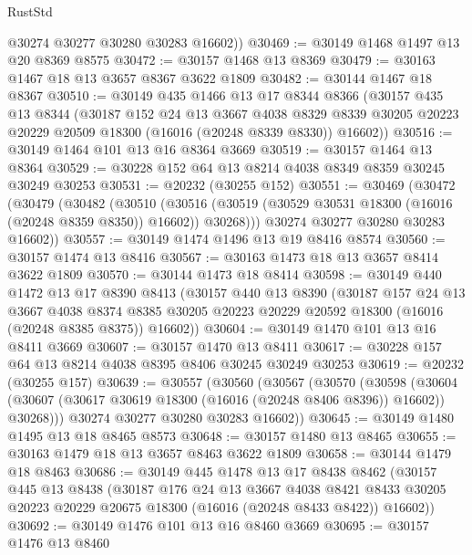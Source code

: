 \begin{lexlean}{RustStd}
\begin{coremodule}
        @30274
        @30277
        @30280
        @30283
        @16602))
@30469 := @30149 @1468 @1497 @13 @20 @8369 @8575
@30472 := @30157 @1468 @13 @8369
@30479 := @30163 @1467 @18 @13 @3657 @8367 @3622 @1809
@30482 := @30144 @1467 @18 @8367
@30510 := @30149
    @435
    @1466
    @13
    @17
    @8344
    @8366
    (@30157
      @435
      @13
      @8344
      (@30187
        @152
        @24
        @13
        @3667
        @4038
        @8329
        @8339
        @30205
        @20223
        @20229
        @20509
        @18300
        (@16016 (@20248 @8339 @8330))
        @16602))
@30516 := @30149 @1464 @101 @13 @16 @8364 @3669
@30519 := @30157 @1464 @13 @8364
@30529 := @30228 @152 @64 @13 @8214 @4038 @8349 @8359 @30245 @30249 @30253
@30531 := @20232 (@30255 @152)
@30551 := @30469
    (@30472
      (@30479
        (@30482
          (@30510
            (@30516 (@30519 (@30529 @30531 @18300 (@16016 (@20248 @8359 @8350)) @16602)) @30268)))
        @30274
        @30277
        @30280
        @30283
        @16602))
@30557 := @30149 @1474 @1496 @13 @19 @8416 @8574
@30560 := @30157 @1474 @13 @8416
@30567 := @30163 @1473 @18 @13 @3657 @8414 @3622 @1809
@30570 := @30144 @1473 @18 @8414
@30598 := @30149
    @440
    @1472
    @13
    @17
    @8390
    @8413
    (@30157
      @440
      @13
      @8390
      (@30187
        @157
        @24
        @13
        @3667
        @4038
        @8374
        @8385
        @30205
        @20223
        @20229
        @20592
        @18300
        (@16016 (@20248 @8385 @8375))
        @16602))
@30604 := @30149 @1470 @101 @13 @16 @8411 @3669
@30607 := @30157 @1470 @13 @8411
@30617 := @30228 @157 @64 @13 @8214 @4038 @8395 @8406 @30245 @30249 @30253
@30619 := @20232 (@30255 @157)
@30639 := @30557
    (@30560
      (@30567
        (@30570
          (@30598
            (@30604 (@30607 (@30617 @30619 @18300 (@16016 (@20248 @8406 @8396)) @16602)) @30268)))
        @30274
        @30277
        @30280
        @30283
        @16602))
@30645 := @30149 @1480 @1495 @13 @18 @8465 @8573
@30648 := @30157 @1480 @13 @8465
@30655 := @30163 @1479 @18 @13 @3657 @8463 @3622 @1809
@30658 := @30144 @1479 @18 @8463
@30686 := @30149
    @445
    @1478
    @13
    @17
    @8438
    @8462
    (@30157
      @445
      @13
      @8438
      (@30187
        @176
        @24
        @13
        @3667
        @4038
        @8421
        @8433
        @30205
        @20223
        @20229
        @20675
        @18300
        (@16016 (@20248 @8433 @8422))
        @16602))
@30692 := @30149 @1476 @101 @13 @16 @8460 @3669
@30695 := @30157 @1476 @13 @8460

\end{coremodule}
\end{lexlean}
